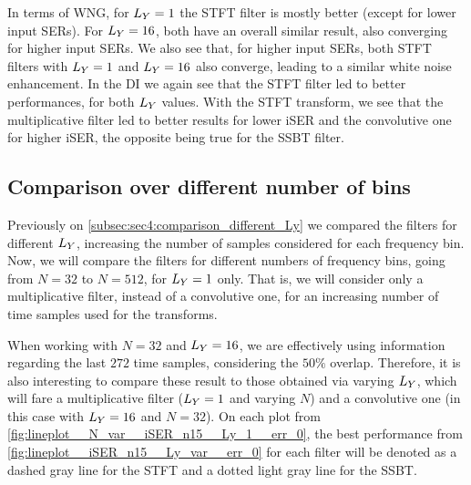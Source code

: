 In terms of WNG, for $\Ly = 1$ the STFT filter is mostly better (except for lower input SERs). For $\Ly = 16$, both have an overall similar result, also converging for higher input SERs. We also see that, for higher input SERs, both STFT filters with $\Ly = 1$ and $\Ly = 16$ also converge, leading to a similar white noise enhancement. In the DI we again see that the STFT filter led to better performances, for both $\Ly$ values. With the STFT transform, we see that the multiplicative filter led to better results for lower iSER and the convolutive one for higher iSER, the opposite being true for the SSBT filter.


\subsection{Comparison over different number of bins}

Previously on \cref{subsec:sec4:comparison_different_Ly} we compared the filters for different $\Ly$, increasing the number of samples considered for each frequency bin. Now, we will compare the filters for different numbers of frequency bins, going from $N = 32$ to $N = 512$, for $\Ly = 1$ only. That is, we will consider only a multiplicative filter, instead of a convolutive one, for an increasing number of time samples used for the transforms.

When working with $N = 32$ and $\Ly = 16$, we are effectively using information regarding the last $272$ time samples, considering the $50\%$ overlap. Therefore, it is also interesting to compare these result to those obtained via varying $\Ly$, which will fare a multiplicative filter ($\Ly = 1$ and varying $N$) and a convolutive one (in this case with $\Ly = 16$ and $N = 32$). On each plot from \cref{fig:lineplot__N_var__iSER_n15__Ly_1__err_0}, the best performance from \cref{fig:lineplot__iSER_n15__Ly_var__err_0} for each filter will be denoted as a dashed gray line for the STFT and a dotted light gray line for the SSBT.


